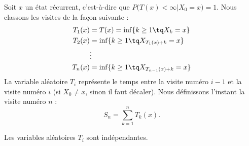 Soit \( x\) un état récurrent, c'est-à-dire que \( P\big( T(x)<\infty|X_0=x \big)=1\). Nous classons les visites de la façon suivante :
\begin{subequations}    \label{SubEqsDefTirectempsretou}
	\begin{align}
		T_1(x) & =T(x)=\inf\{ k\geq 1\tq X_k=x \}         \\
		T_2(x) & =\inf\{ k\geq 1\tq X_{T_1(x)+k}=x \}     \\
		       & \vdots                                   \\
		T_n(x) & =\inf\{ k\geq 1\tq X_{T_{n-1}(x)+k}=x \}
	\end{align}
\end{subequations}
La variable aléatoire \( T_i\) représente le temps entre la visite numéro \( i-1\) et la visite numéro \( i\) (si \( X_0\neq x\), sinon il faut décaler). Nous définissons l'instant la visite numéro \( n\) :
\begin{equation}
	S_n=\sum_{k=1}^nT_k(x).
\end{equation}

\begin{lemma}
	Les variables aléatoires \( T_i\) sont indépendantes.
\end{lemma}

